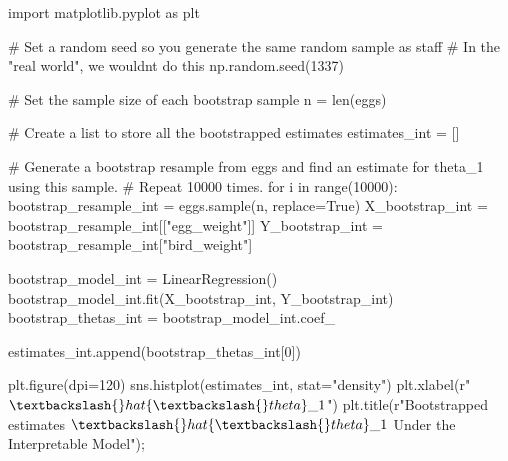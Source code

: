 \documentclass[
  letterpaper,
  DIV=11,
  numbers=noendperiod]{scrreprt}
\newenvironment{Shaded}{\begin{snugshade}}{\end{snugshade}}
\newcommand{\BuiltInTok}[1]{\textcolor[rgb]{0.00,0.23,0.31}{#1}}
\newcommand{\CommentTok}[1]{\textcolor[rgb]{0.37,0.37,0.37}{#1}}
\newcommand{\ControlFlowTok}[1]{\textcolor[rgb]{0.00,0.23,0.31}{#1}}
\newcommand{\DecValTok}[1]{\textcolor[rgb]{0.68,0.00,0.00}{#1}}
\newcommand{\ImportTok}[1]{\textcolor[rgb]{0.00,0.46,0.62}{#1}}
\newcommand{\KeywordTok}[1]{\textcolor[rgb]{0.00,0.23,0.31}{#1}}
\newcommand{\NormalTok}[1]{\textcolor[rgb]{0.00,0.23,0.31}{#1}}
\newcommand{\OperatorTok}[1]{\textcolor[rgb]{0.37,0.37,0.37}{#1}}
\newcommand{\StringTok}[1]{\textcolor[rgb]{0.13,0.47,0.30}{#1}}
\newcommand{\VariableTok}[1]{\textcolor[rgb]{0.07,0.07,0.07}{#1}}
\newcommand{\VerbatimStringTok}[1]{\textcolor[rgb]{0.13,0.47,0.30}{#1}}
\begin{document}
\begin{Shaded}
\begin{Highlighting}[]
\ImportTok{import}\NormalTok{ matplotlib.pyplot }\ImportTok{as}\NormalTok{ plt}

\CommentTok{\# Set a random seed so you generate the same random sample as staff}
\CommentTok{\# In the "real world", we wouldn\textquotesingle{}t do this}
\NormalTok{np.random.seed(}\DecValTok{1337}\NormalTok{)}

\CommentTok{\# Set the sample size of each bootstrap sample}
\NormalTok{n }\OperatorTok{=} \BuiltInTok{len}\NormalTok{(eggs)}

\CommentTok{\# Create a list to store all the bootstrapped estimates}
\NormalTok{estimates\_int }\OperatorTok{=}\NormalTok{ []}

\CommentTok{\# Generate a bootstrap resample from \textasciigrave{}eggs\textasciigrave{} and find an estimate for theta\_1 using this sample. }
\CommentTok{\# Repeat 10000 times.}
\ControlFlowTok{for}\NormalTok{ i }\KeywordTok{in} \BuiltInTok{range}\NormalTok{(}\DecValTok{10000}\NormalTok{):}
\NormalTok{    bootstrap\_resample\_int }\OperatorTok{=}\NormalTok{ eggs.sample(n, replace}\OperatorTok{=}\VariableTok{True}\NormalTok{)}
\NormalTok{    X\_bootstrap\_int }\OperatorTok{=}\NormalTok{ bootstrap\_resample\_int[[}\StringTok{"egg\_weight"}\NormalTok{]]}
\NormalTok{    Y\_bootstrap\_int }\OperatorTok{=}\NormalTok{ bootstrap\_resample\_int[}\StringTok{"bird\_weight"}\NormalTok{]}
    
\NormalTok{    bootstrap\_model\_int }\OperatorTok{=}\NormalTok{ LinearRegression()}
\NormalTok{    bootstrap\_model\_int.fit(X\_bootstrap\_int, Y\_bootstrap\_int)}
\NormalTok{    bootstrap\_thetas\_int }\OperatorTok{=}\NormalTok{ bootstrap\_model\_int.coef\_}
    
\NormalTok{    estimates\_int.append(bootstrap\_thetas\_int[}\DecValTok{0}\NormalTok{])}

\NormalTok{plt.figure(dpi}\OperatorTok{=}\DecValTok{120}\NormalTok{)}
\NormalTok{sns.histplot(estimates\_int, stat}\OperatorTok{=}\StringTok{"density"}\NormalTok{)}
\NormalTok{plt.xlabel(}\VerbatimStringTok{r"$\textbackslash{}hat\{\textbackslash{}theta\}\_1$"}\NormalTok{)}
\NormalTok{plt.title(}\VerbatimStringTok{r"Bootstrapped estimates $\textbackslash{}hat\{\textbackslash{}theta\}\_1$ Under the Interpretable Model"}\NormalTok{)}\OperatorTok{;}
\end{Highlighting}
\end{Shaded}
\end{document}
